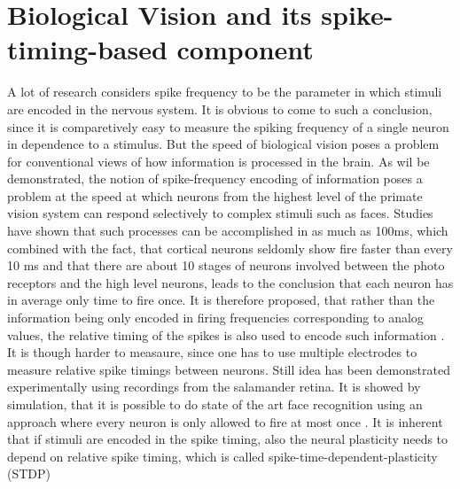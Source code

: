 \documentclass{SeminarV2}
\begin{document}
\section{Biological Vision and its spike-timing-based component} 
A lot of research considers spike frequency to be the parameter in which stimuli are encoded in the nervous system. It is obvious to come to such a conclusion, since it is comparetively easy to measure the spiking frequency of a single neuron in dependence to a stimulus.
But the speed of biological vision poses a problem for conventional views of how information is processed in the brain.
As wil be demonstrated, the notion of spike-frequency encoding of information poses a problem at the speed at which neurons from the highest level of the primate vision system can respond selectively to complex stimuli such as faces.
Studies have shown that such processes can be accomplished in as much as 100ms, which combined with the fact, that cortical neurons seldomly show fire faster than every 10 ms and that there are about 10 stages of neurons involved between the photo receptors and the high level neurons, leads to the conclusion that each neuron has in average only time to fire once.
It is therefore proposed, that rather than the information being only encoded in firing frequencies corresponding to analog values,
the relative timing of the spikes is also used to encode such information \cite{thorpe_biological_1989} \cite{bialek_reading_1991} \cite{gerstner_why_1993}. It is though harder to measaure, since one has to use multiple electrodes to measure relative spike timings between neurons.
Still idea has been demonstrated experimentally using recordings from the salamander retina\cite{gollisch_rapid_2008}.
It is showed by simulation, that it is possible to do state of the art face recognition using an approach 
where every neuron is only allowed to fire at most once \cite{thorpe_spike-based_2012}.
It is inherent that if stimuli are encoded in the spike timing, also the neural plasticity needs to depend on relative spike timing, which is called spike-time-dependent-plasticity (STDP)
\end{document}

